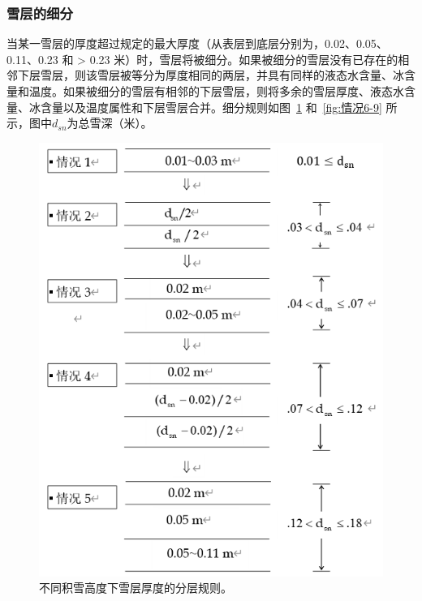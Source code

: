 \subsubsection{雪层的细分}
当某一雪层的厚度超过规定的最大厚度（从表层到底层分别为，0.02、0.05、0.11、0.23 和 > 0.23 米）时，雪层将被细分。如果被细分的雪层没有已存在的相邻下层雪层，则该雪层被等分为厚度相同的两层，并具有同样的液态水含量、冰含量和温度。如果被细分的雪层有相邻的下层雪层，则将多余的雪层厚度、液态水含量、冰含量以及温度属性和下层雪层合并。细分规则如图~\ref{fig:情况1-5} 和~\ref{fig:情况6-9} 所示，图中$d_{sn}$为总雪深（米）。

{
\begin{figure}[]
\centering
\includegraphics{Figures/雪盖土壤热力过程/情况1-5.png}
\caption{不同积雪高度下雪层厚度的分层规则。}
\label{fig:情况1-5}
\end{figure}
}

